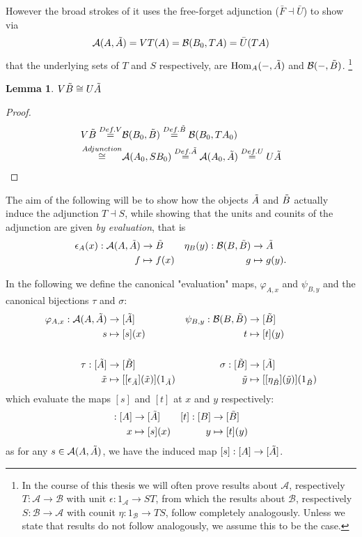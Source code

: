 \documentclass[12pt,a4paper]{article}
\newtheorem{lemma}{Lemma}[section] %
\DeclareMathOperator{\Hom}{Hom}
\def\HomA{\ensuremath\mathcal{A}}
\def\HomB{\ensuremath\mathcal{B}}
\def\t{\ensuremath\tilde}
\begin{document}
However the broad strokes of it uses the free-forget  adjunction ($\bar F \dashv \bar U$)  to show via \begin{align*}
	\HomA(A, \t A) = VT(A) = \HomB(B_0, T A) = \bar U(TA)
\end{align*} 
that the underlying sets of $T$ and $S$ respectively, are $\Hom_A(-, \t A)$ and $\HomB(-, \t B)$. \footnote{In the course of this thesis we will often prove results about $\mathcal{A}$, respectively $T: \mathcal{A}\to \mathcal{B}$ with unit $\epsilon:1_\mathcal{A} \to ST $, from which the results about $\mathcal{B}$, respectively $S: \mathcal{B} \to \mathcal{A}$ with counit $\eta: 1_\mathcal{B} \to TS$, follow completely analogously. Unless we state that results do not follow analogously, we assume this to be the case.}

\begin{lemma}
	$V \t B \cong U \t A$
\end{lemma}
\begin{proof}
	\begin{align*}
		V \t B \stackrel{Def. V}{=}& \HomB(B_0,\t B) \stackrel{Def. \t B}{=} \HomB(B_0, TA_0)\\ \stackrel{Adjunction}{\cong}& \HomA(A_0,SB_0) \stackrel{Def. \t A}{=}\HomA(A_0,\t A) \stackrel{Def. U}{=} U\t A
	\end{align*} \end{proof}
	
	The aim of the following will be to show how the objects $\t A$ and $\t B$ actually induce the adjunction $T \dashv S$, while showing that the units and counits of the adjunction are given \emph{by evaluation}, that is \begin{align*}
		\epsilon_A(x): \HomA(A, \t A) &\to \t B& \eta_B(y) : \HomB(B, \t 
		B) &\to \t A\\
		f & \mapsto f(x)& g &\mapsto g(y).
	\end{align*}
	
	In the following we define the canonical "evaluation" maps, $\varphi_{A, x}$ and $\psi_{B, y}$ and the canonical bijections $\tau$ and $\sigma$:  
\begin{align*}
	\varphi_{A, x} : \HomA(A, \t A) &\to [\t A ]& \psi_{B, y} : \HomB(B, \t B) &\to [\t B ]\\
	 s &\mapsto [s](x) &t &\mapsto [t](y) \\\\
	 \tau: [\t A] &\to [\t B]&\sigma: [\t B] &\to [\t A]\\
	 \t x &\mapsto  [[\epsilon_{\t A}](\t x)](1_{\t A})&\t y &\mapsto  [[\eta_{\t B}](\t y)](1_{\t B})
\end{align*}
which evaluate the maps $[s]$ and $[t]$ at $x$ and $y$ respectively:
\begin{align*}
	[s]: [A] &\to [\t A]&[t]: [B] &\to [\t B]\\
	x &\mapsto [s](x)& y &\mapsto [t](y)
\end{align*}
as for any $s \in \HomA(A, \t A) $, we have the induced map $[s]: [A] \to [\t A]$.
\end{document}

